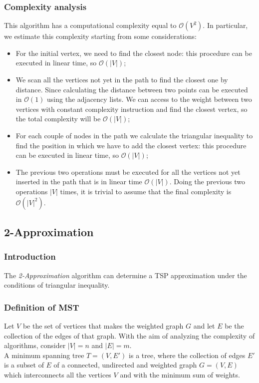 \subsubsection{Complexity analysis}
This algorithm has a computational complexity equal to $\mathcal{O}(V^2)$. In particular, we estimate this complexity starting from some considerations:
\begin{itemize}
    \item For the initial vertex, we need to find the closest node: this procedure can be executed in linear time, so $\mathcal{O}(|V|)$;
    \item We scan all the vertices not yet in the path to find the closest one by distance. Since calculating the distance between two points can be executed in $\mathcal{O}(1)$ using the adjacency lists. We can access to the weight between two vertices with constant complexity instruction and find the closest vertex, so the total complexity will be $\mathcal{O}(|V|)$;
    \item For each couple of nodes in the path we calculate the triangular inequality to find the position in which we have to add the closest vertex: this procedure can be executed in linear time, so $\mathcal{O}(|V|)$;
    \item The previous two operations must be executed for all the vertices not yet inserted in the path that is in linear time $\mathcal{O}(|V|)$. Doing the previous two operations $|V|$ times, it is trivial to assume that the final complexity is $\mathcal{O}(|V|^2)$. 
\end{itemize}

\subsection{2-Approximation}

\subsubsection{Introduction}
The \textit{2-Approximation} algorithm can determine a TSP approximation under the conditions of triangular inequality.

\subsubsection{Definition of MST}
Let $V$ be the set of vertices that makes the weighted graph $G$ and let $E$ be the collection of the edges of that graph. With the aim of analyzing the complexity of algorithms, consider $|V| = n$ and $|E| = m$. \\
A minimum spanning tree $T = (V,E')$ is a tree, where the collection of edges $E'$ is a subset of $E$ of a connected, undirected and weighted graph $G = (V,E)$ which interconnects all the vertices $V$ and with the minimum sum of weights. \\

